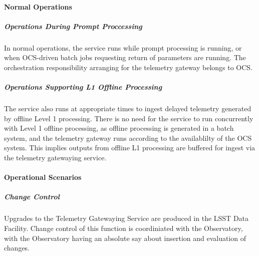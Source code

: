 \paragraph{Normal Operations}

\subparagraph{Operations During Prompt Proccessing}

In normal operations, the service runs while prompt processing is running,
or when OCS-driven batch jobs requesting return of parameters are running.
The orchestration responsibility arranging for the telemetry gateway belongs to OCS.

\subparagraph{Operations Supporting L1 Offline Processing}
The service also runs at appropriate times to ingest delayed telemetry
generated by offline Level 1  processing. There is no need for the service
to run concurrently with Level 1 offline processing, as offline processing is
generated in a batch system, and the telemetry gateway runs according to
the availablilty of the OCS system. This implies outputs from offline L1 processing
are buffered for ingest via the telemetry gatewaying service.

\paragraph{Operational Scenarios}

\subparagraph{Change Control}

Upgrades to the Telemetry Gatewaying Service are produced in the LSST Data Facility.
Change control of this function is coordiniated with the Observatory, with the
Observatory having an absolute say about insertion and evaluation of changes.
